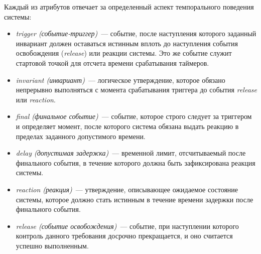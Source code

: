 Каждый из атрибутов отвечает за определенный аспект темпорального поведения системы:
\begin{itemize}
  \item \textit{trigger (событие-триггер)}~--- событие, после наступления которого заданный инвариант должен оставаться истинным вплоть до наступления события освобождения (\textit{release}) или реакции системы. Это же событие служит стартовой точкой для отсчета времени срабатывания таймеров.
    
  \item \textit{invariant (инвариант)}~--- логическое утверждение, которое обязано непрерывно выполняться с момента срабатывания триггера до события \textit{release} или \textit{reaction}.
    
    \item \textit{final (финальное событие)}~--- событие, которое строго следует за триггером и определяет момент, после которого система обязана выдать реакцию в пределах заданного допустимого времени.
    
    \item \textit{delay (допустимая задержка)}~--- временной лимит, отсчитываемый после финального события, в течение которого должна быть зафиксирована реакция системы.
    
    \item \textit{reaction (реакция)}~--- утверждение, описывающее ожидаемое состояние системы, которое должно стать истинным в течение времени задержки после финального события.
    
    \item \textit{release (событие освобождения)}~--- событие, при наступлении которого контроль данного требования досрочно прекращается, и оно считается успешно выполненным.
\end{itemize}

